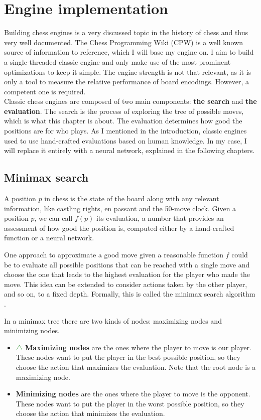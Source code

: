 \section{Engine implementation}

Building chess engines is a very discussed topic in the history of chess and thus very well documented. The Chess Programming Wiki (CPW) \cite{cpw} is a well known source of information to reference, which I will base my engine on. I aim to build a single-threaded classic engine and only make use of the most prominent optimizations to keep it simple. The engine strength is not that relevant, as it is only a tool to measure the relative performance of board encodings. However, a competent one is required. \\

Classic chess engines are composed of two main components: \textbf{the search} and \textbf{the evaluation}. The search is the process of exploring the tree of possible moves, which is what this chapter is about. The evaluation determines how good the positions are for who plays. As I mentioned in the introduction, classic engines used to use hand-crafted evaluations based on human knowledge. In my case, I will replace it entirely with a neural network, explained in the following chapters.

\subsection{Minimax search}

A position $p$ in chess is the state of the board along with any relevant information, like castling rights, en passant and the 50-move clock. Given a position $p$, we can call $f(p)$ its evaluation, a number that provides an assessment of how good the position is, computed either by a hand-crafted function or a neural network.

One approach to approximate a good move given a reasonable function $f$ could be to evaluate all possible positions that can be reached with a single move and choose the one that leads to the highest evaluation for the player who made the move. This idea can be extended to consider actions taken by the other player, and so on, to a fixed depth. Formally, this is called the minimax search algorithm \cite{minimax-survey:1995}.

In a minimax tree there are two kinds of nodes: maximizing nodes and minimizing nodes. 

\begin{itemize}
\item \textcolor{ForestGreen}{$\triangle$} \textbf{Maximizing nodes} are the ones where the player to move is our player. These nodes want to put the player in the best possible position, so they choose the action that maximizes the evaluation. Note that the root node is a maximizing node.
\item \textcolor{red}{} \textbf{Minimizing nodes} are the ones where the player to move is the opponent. These nodes want to put the player in the worst possible position, so they choose the action that minimizes the evaluation.
\end{itemize}


